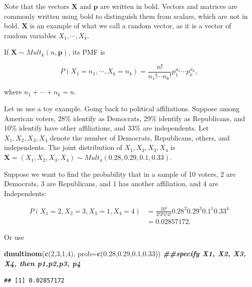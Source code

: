 \documentclass[
]{book}
\newenvironment{Shaded}{\begin{snugshade}}{\end{snugshade}}
\newcommand{\AttributeTok}[1]{\textcolor[rgb]{0.13,0.29,0.53}{#1}}
\newcommand{\DecValTok}[1]{\textcolor[rgb]{0.00,0.00,0.81}{#1}}
\newcommand{\DocumentationTok}[1]{\textcolor[rgb]{0.56,0.35,0.01}{\textbf{\textit{#1}}}}
\newcommand{\FloatTok}[1]{\textcolor[rgb]{0.00,0.00,0.81}{#1}}
\newcommand{\FunctionTok}[1]{\textcolor[rgb]{0.13,0.29,0.53}{\textbf{#1}}}
\newcommand{\NormalTok}[1]{#1}
\begin{document}
Note that the vectors \(\boldsymbol{X}\) and \(\boldsymbol{p}\) are written in bold. Vectors and matrices are commonly written using bold to distinguish them from scalars, which are not in bold. \(\boldsymbol{X}\) is an example of what we call a random vector, as it is a vector of random variables \(X_1, \cdots, X_k\).

If \(\boldsymbol{X} \sim Mult_k(n, \boldsymbol{p})\), its PMF is

\begin{equation} 
P(X_1 = n_1, \cdots, X_k = n_k) = \frac{n!}{n_{1}! \cdots n_{k}!} p_1^{n_1} \cdots p_k^{n_k},
\label{eq:5-multinomial}
\end{equation}

where \(n_1 + \cdots + n_k = n\).

Let us use a toy example. Going back to political affiliations. Suppose among American voters, 28\% identify as Democrats, 29\% identify as Republicans, and 10\% identify have other affiliations, and 33\% are independents. Let \(X_1, X_2, X_3, X_4\) denote the number of Democrats, Republicans, others, and independents. The joint distribution of \(X_1, X_2, X_3, X_4\) is \(\boldsymbol{X} = (X_1, X_2, X_3, X_4) \sim Mult_4(0.28, 0.29, 0.1, 0.33)\).

Suppose we want to find the probability that in a sample of 10 voters, 2 are Democrats, 3 are Republicans, and 1 has another affiliation, and 4 are Independents:

\[
\begin{split}
P(X_1 = 2, X_2 = 3, X_3 = 1, X_4 = 4) &= \frac{10!}{2! 3! 1!4!} 0.28^{2} 0.29^{3} 0.1^1 0.33^4\\
 &= 0.02857172.
\end{split}
\]

Or use

\begin{Shaded}
\begin{Highlighting}[]
\FunctionTok{dmultinom}\NormalTok{(}\FunctionTok{c}\NormalTok{(}\DecValTok{2}\NormalTok{,}\DecValTok{3}\NormalTok{,}\DecValTok{1}\NormalTok{,}\DecValTok{4}\NormalTok{), }\AttributeTok{prob=}\FunctionTok{c}\NormalTok{(}\FloatTok{0.28}\NormalTok{,}\FloatTok{0.29}\NormalTok{,}\FloatTok{0.1}\NormalTok{,}\FloatTok{0.33}\NormalTok{)) }\DocumentationTok{\#\#specify X1, X2, X3, X4, then p1,p2,p3, p4}
\end{Highlighting}
\end{Shaded}

\begin{verbatim}
## [1] 0.02857172
\end{verbatim}
\end{document}
